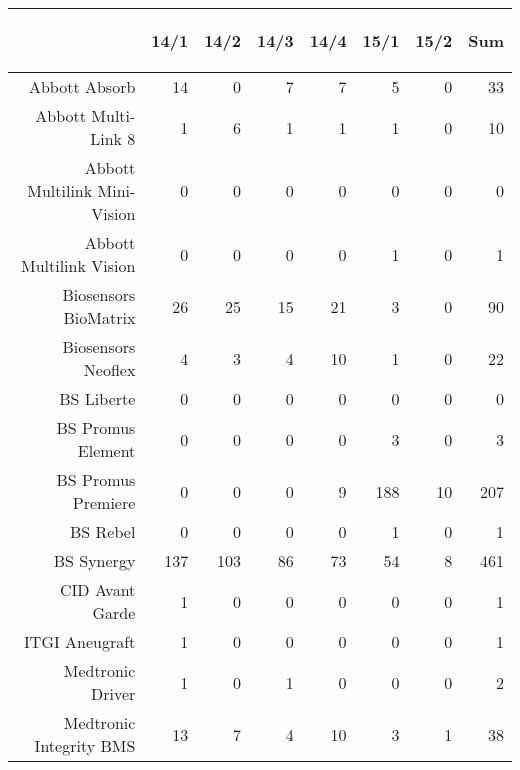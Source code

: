\documentclass[presentation,xcolor=pdftex,dvipsnames,table]{beamer}
\begin{document}
\begin{frame}
\begin{tiny}
\begin{table}[ht]
\centering
\begin{tabular}{rrrrrrrr}
  \toprule
 & \begin{sideways} 14/1 \end{sideways} & \begin{sideways} 14/2 \end{sideways} & \begin{sideways} 14/3 \end{sideways} & \begin{sideways} 14/4 \end{sideways} & \begin{sideways} 15/1 \end{sideways} & \begin{sideways} 15/2 \end{sideways} & \begin{sideways} Sum \end{sideways} \\ 
  \midrule
Abbott Absorb & 14 & 0 & 7 & 7 & 5 & 0 & 33 \\ 
  Abbott Multi-Link 8 & 1 & 6 & 1 & 1 & 1 & 0 & 10 \\ 
  Abbott Multilink Mini-Vision & 0 & 0 & 0 & 0 & 0 & 0 & 0 \\ 
  Abbott Multilink Vision & 0 & 0 & 0 & 0 & 1 & 0 & 1 \\ 
  Biosensors BioMatrix & 26 & 25 & 15 & 21 & 3 & 0 & 90 \\ 
  Biosensors Neoflex & 4 & 3 & 4 & 10 & 1 & 0 & 22 \\ 
  BS Liberte & 0 & 0 & 0 & 0 & 0 & 0 & 0 \\ 
  BS Promus Element & 0 & 0 & 0 & 0 & 3 & 0 & 3 \\ 
  BS Promus Premiere & 0 & 0 & 0 & 9 & 188 & 10 & 207 \\ 
  BS Rebel & 0 & 0 & 0 & 0 & 1 & 0 & 1 \\ 
  BS Synergy & 137 & 103 & 86 & 73 & 54 & 8 & 461 \\ 
  CID Avant Garde & 1 & 0 & 0 & 0 & 0 & 0 & 1 \\ 
  ITGI Aneugraft & 1 & 0 & 0 & 0 & 0 & 0 & 1 \\ 
  Medtronic Driver & 1 & 0 & 1 & 0 & 0 & 0 & 2 \\ 
  Medtronic Integrity BMS & 13 & 7 & 4 & 10 & 3 & 1 & 38 \\ 

\end{tabular}
\end{table}
\end{tiny}
\end{frame}
\end{document}
